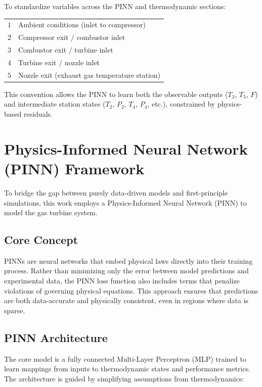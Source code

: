 \documentclass[
  12pt,
  oneside,
  a4paper,
  english,
  brazil]{abntex2}
\begin{document}
To standardize variables across the PINN and thermodynamic sections:

\begin{center}
\begin{tabular}{ll}
$1$ & Ambient conditions (inlet to compressor) \\
$2$ & Compressor exit / combustor inlet \\
$3$ & Combustor exit / turbine inlet \\
$4$ & Turbine exit / nozzle inlet \\
$5$ & Nozzle exit (exhaust gas temperature station)
\end{tabular}
\end{center}

This convention allows the PINN to learn both the observable outputs
(\(T_3\), \(T_5\), \(F\)) and intermediate station states (\(T_2\),
\(P_2\), \(T_4\), \(P_4\), etc.), constrained by physics-based
residuals.

\section{Physics-Informed Neural Network (PINN)
Framework}\label{physics-informed-neural-network-pinn-framework}

To bridge the gap between purely data-driven models and first-principle
simulations, this work employs a Physics-Informed Neural Network (PINN)
to model the gas turbine system.

\subsection{Core Concept}\label{core-concept}

PINNs are neural networks that embed physical laws directly into their
training process. Rather than minimizing only the error between model
predictions and experimental data, the PINN loss function also includes
terms that penalize violations of governing physical equations. This
approach ensures that predictions are both data-accurate and physically
consistent, even in regions where data is sparse.

\subsection{PINN Architecture}\label{pinn-architecture}

The core model is a fully connected Multi-Layer Perceptron (MLP) trained
to learn mappings from inputs to thermodynamic states and performance
metrics. The architecture is guided by simplifying assumptions from
thermodynamics:
\end{document}
